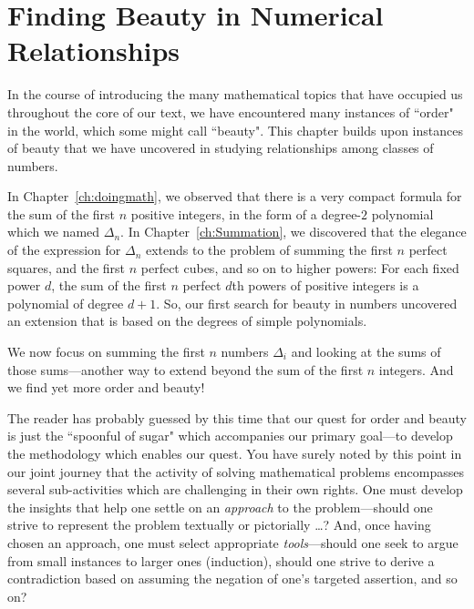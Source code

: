 
\chapter{Finding Beauty in Numerical Relationships}
\label{Appendix:Tetra}

In the course of introducing the many mathematical topics that have occupied us throughout the core of our text, we have encountered many instances of ``order" in the world, which some might call ``beauty".  This chapter builds upon instances of beauty that we have uncovered in studying relationships among classes of numbers.

\medskip

In Chapter~\ref{ch:doingmath}, we observed that there is a very compact formula for the sum of the first $n$ positive integers, in the form of a degree-$2$ polynomial which we named $\Delta_n$.  In Chapter~\ref{ch:Summation}, we discovered that the elegance of the expression for $\Delta_n$ extends to the problem of summing the first $n$ perfect squares, and the first $n$ perfect cubes, and so on to higher powers:  For each fixed power $d$, the sum of the first $n$ perfect $d$th powers of positive integers is a polynomial of degree $d+1$.  So, our first search for beauty in numbers uncovered an extension that is based on the degrees of simple polynomials.

\smallskip

We now focus on summing the first $n$ numbers $\Delta_i$ and looking at the sums of those sums---another way to extend beyond the sum of the first $n$ integers.  And we find yet more order and beauty!

\medskip

The reader has probably guessed by this time that our quest for order and beauty is just the ``spoonful of sugar" which accompanies our primary goal---to develop the methodology which enables our quest.  You have surely noted by this point in our joint journey that the activity of solving mathematical problems encompasses several sub-activities which are challenging in their own rights.  One must develop the insights that help one settle on an {\em approach} to the problem---should one strive to represent the problem textually or pictorially \ldots?  And, once having chosen an approach, one must select appropriate {\em tools}---should one seek to argue from small instances to larger ones (induction), should one strive to derive a contradiction based on assuming the negation of one's targeted assertion, and so on?

